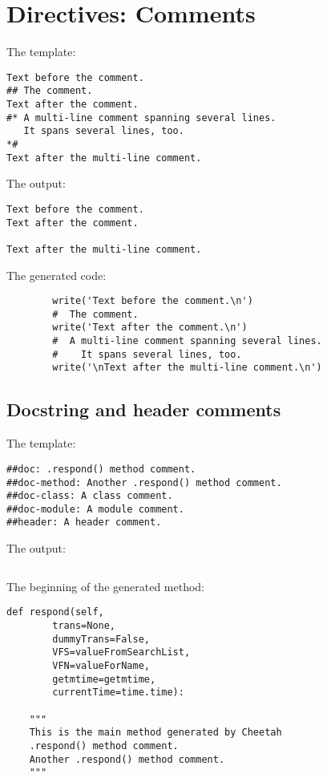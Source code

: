 \section{Directives: Comments}
\label{comments}

The template:

\begin{verbatim}
Text before the comment.
## The comment.
Text after the comment.
#* A multi-line comment spanning several lines.
   It spans several lines, too.
*# 
Text after the multi-line comment.
\end{verbatim}

The output:

\begin{verbatim}
Text before the comment.
Text after the comment.

Text after the multi-line comment.

\end{verbatim}

The generated code:

\begin{verbatim}
        write('Text before the comment.\n')
        #  The comment.
        write('Text after the comment.\n')
        #  A multi-line comment spanning several lines.
        #    It spans several lines, too.
        write('\nText after the multi-line comment.\n')
\end{verbatim}

\subsection{Docstring and header comments}
\label{comments.docstring}

The template:
\begin{verbatim}
##doc: .respond() method comment.
##doc-method: Another .respond() method comment.
##doc-class: A class comment.
##doc-module: A module comment.
##header: A header comment.
\end{verbatim}

The output:
\begin{verbatim}

\end{verbatim}

The beginning of the generated  method:
\begin{verbatim}
def respond(self,
        trans=None,
        dummyTrans=False,
        VFS=valueFromSearchList,
        VFN=valueForName,
        getmtime=getmtime,
        currentTime=time.time):

    """
    This is the main method generated by Cheetah
    .respond() method comment.
    Another .respond() method comment.
    """
\end{verbatim}

